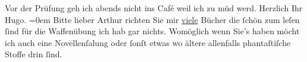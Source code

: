            \pstart
           Vor der Prüfung geh ich abends nicht ins Café weil ich zu müd werd.\pend
           \pstart
           Herzlich Ihr{\\[\baselineskip]}\spacefill\mbox{Hugo.}\pend
           \leftskip=0em{}\pstart
           \noindent{}Bitte lieber Arthur richten Sie {\pb}mir \uline{viele} Bücher die ſchön zum leſen ſind für die Waffenübung ich
                        hab gar nichts. Womöglich wenn Sie’s haben möcht ich auch eine Novellenſa{\geminationm}lung oder ſonſt etwas wo ältere allenfalls
                        phantaſtiſche Stoffe drin ſind.\pend
           \endnumbering{}  
      